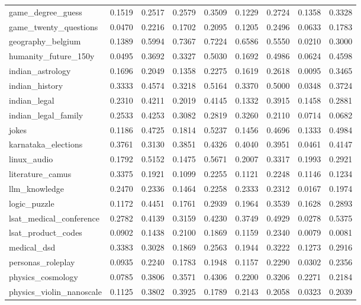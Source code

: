 \documentclass[pdflatex,sn-mathphys-num]{sn-jnl}%
\theoremstyle{thmstyleone}%
\theoremstyle{thmstyletwo}%
\theoremstyle{thmstylethree}%
\begin{document}
\begin{appendices}
\begin{landscape}
\begin{longtable}{@{}p{3.8cm}cccccccc@{}}
game\_degree\_guess & 0.1519 & 0.2517 & 0.2579 & 0.3509 & 0.1229 & 0.2724 & 0.1358 & 0.3328 \\
game\_twenty\_questions & 0.0470 & 0.2216 & 0.1702 & 0.2095 & 0.1205 & 0.2496 & 0.0633 & 0.1783 \\
geography\_belgium & 0.1389 & 0.5994 & 0.7367 & 0.7224 & 0.6586 & 0.5550 & 0.0210 & 0.3000 \\
humanity\_future\_150y & 0.0495 & 0.3692 & 0.3327 & 0.5030 & 0.1692 & 0.4986 & 0.0624 & 0.4598 \\
indian\_astrology & 0.1696 & 0.2049 & 0.1358 & 0.2275 & 0.1619 & 0.2618 & 0.0095 & 0.3465 \\
indian\_history & 0.3333 & 0.4574 & 0.3218 & 0.5164 & 0.3370 & 0.5000 & 0.0348 & 0.3724 \\
indian\_legal & 0.2310 & 0.4211 & 0.2019 & 0.4145 & 0.1332 & 0.3915 & 0.1458 & 0.2881 \\
indian\_legal\_family & 0.2533 & 0.4253 & 0.3082 & 0.2819 & 0.3260 & 0.2110 & 0.0714 & 0.0682 \\
jokes & 0.1186 & 0.4725 & 0.1814 & 0.5237 & 0.1456 & 0.4696 & 0.1333 & 0.4984 \\
karnataka\_elections & 0.3761 & 0.3130 & 0.3851 & 0.4326 & 0.4040 & 0.3951 & 0.0461 & 0.4147 \\
linux\_audio & 0.1792 & 0.5152 & 0.1475 & 0.5671 & 0.2007 & 0.3317 & 0.1993 & 0.2921 \\
literature\_camus & 0.3375 & 0.1921 & 0.1099 & 0.2255 & 0.1121 & 0.2248 & 0.1146 & 0.1234 \\
llm\_knowledge & 0.2470 & 0.2336 & 0.1464 & 0.2258 & 0.2333 & 0.2312 & 0.0167 & 0.1974 \\
logic\_puzzle & 0.1172 & 0.4451 & 0.1761 & 0.2939 & 0.1964 & 0.3539 & 0.1628 & 0.2893 \\
lsat\_medical\_conference & 0.2782 & 0.4139 & 0.3159 & 0.4230 & 0.3749 & 0.4929 & 0.0278 & 0.5375 \\
lsat\_product\_codes & 0.0902 & 0.1438 & 0.2100 & 0.1869 & 0.1159 & 0.2340 & 0.0079 & 0.0081 \\
medical\_dsd & 0.3383 & 0.3028 & 0.1869 & 0.2563 & 0.1944 & 0.3222 & 0.1273 & 0.2916 \\
personas\_roleplay & 0.0935 & 0.2240 & 0.1783 & 0.1948 & 0.1157 & 0.2290 & 0.0302 & 0.2356 \\
physics\_cosmology & 0.0785 & 0.3806 & 0.3571 & 0.4306 & 0.2200 & 0.3206 & 0.2271 & 0.2184 \\
physics\_violin\_nanoscale & 0.1125 & 0.3802 & 0.3925 & 0.1789 & 0.2143 & 0.2058 & 0.0323 & 0.2039 \\

\end{longtable}
\end{landscape}
\end{appendices}
\end{document}
